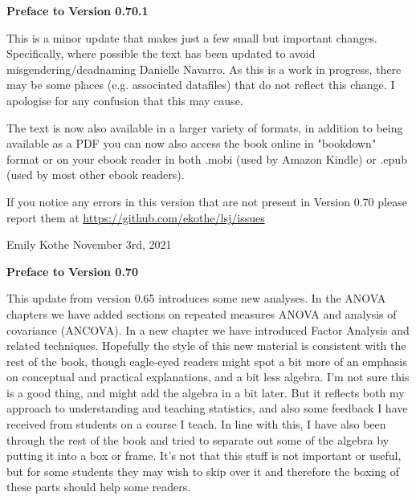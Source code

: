 

\newcommand{\vsp}{\vspace*{6pt}}

\begin{center}{\Large {\bf Preface to Version 0.70.1}}\end{center}
\vspace*{12pt}

\noindent
This is a minor update that makes just a few small but important changes. Specifically, 
where possible the text has been updated to avoid misgendering/deadnaming Danielle Navarro. As this is a work in progress, there may be some places (e.g. associated datafiles) that do not reflect this change. I apologise for any confusion that this may cause.

The text is now also available in a larger variety of formats, in addition to being available as a PDF you can now also access the book online in "bookdown" format or on your ebook reader in both .mobi (used by Amazon Kindle) or .epub (used by most other ebook readers).

If you notice any errors in this version that are not present in Version 0.70 please report them at  \url{https://github.com/ekothe/lsj/issues}

\vspace*{24pt}
\noindent
Emily Kothe
\noindent
November 3rd, 2021

\vspace*{30pt}

\begin{center}{\Large {\bf Preface to Version 0.70}}\end{center}
\vspace*{12pt}

\noindent
This update from version 0.65 introduces some new analyses. In the ANOVA chapters we have added sections on repeated measures ANOVA and analysis of covariance (ANCOVA). In a new chapter we have introduced Factor Analysis and related techniques. Hopefully the style of this new material is consistent with the rest of the book, though eagle-eyed readers might spot a bit more of an emphasis on conceptual and practical explanations, and a bit less algebra. I'm not sure this is a good thing, and might add the algebra in a bit later. But it reflects both my approach to understanding and teaching statistics, and also some feedback I have received from students on a course I teach. In line with this, I have also been through the rest of the book and tried to separate out some of the algebra by putting it into a box or frame. It's not that this stuff is not important or useful, but for some students they may wish to skip over it and therefore the boxing of these parts should help some readers. 

